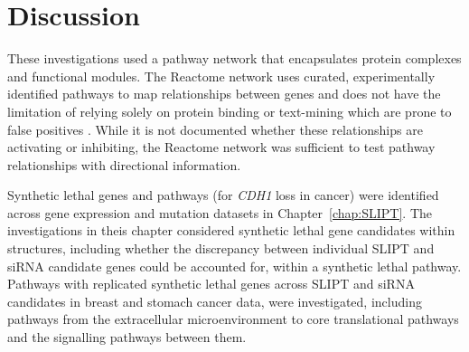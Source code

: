\FloatBarrier

\section{Discussion}

These investigations used a \gls{pathway} network that encapsulates protein complexes and functional modules. The Reactome network uses curated, experimentally identified \glspl{pathway} to map relationships between genes and does not have the limitation of relying solely on protein binding or text-mining which are prone to false positives \citep{Reactome}. While it is not documented whether these relationships are activating or inhibiting, the Reactome network \citep{Reactome} was sufficient to test \gls{pathway} relationships with directional information.

Synthetic lethal genes and \glspl{pathway} (for \textit{CDH1} loss in cancer) were identified across \gls{gene expression} and \gls{mutation} datasets in Chapter~\ref{chap:SLIPT}.
The investigations in theis chapter considered \gls{synthetic lethal} gene candidates within  structures, including whether the discrepancy between individual \gls{SLIPT} and \gls{siRNA} candidate genes could be accounted for, within a \gls{synthetic lethal} \gls{pathway}.
%
Pathways with replicated \gls{synthetic lethal} genes across \gls{SLIPT} and \gls{siRNA} candidates in breast and stomach cancer data, were investigated, including \glspl{pathway} from the extracellular microenvironment to core translational \glspl{pathway} and the signalling \glspl{pathway} between them.

